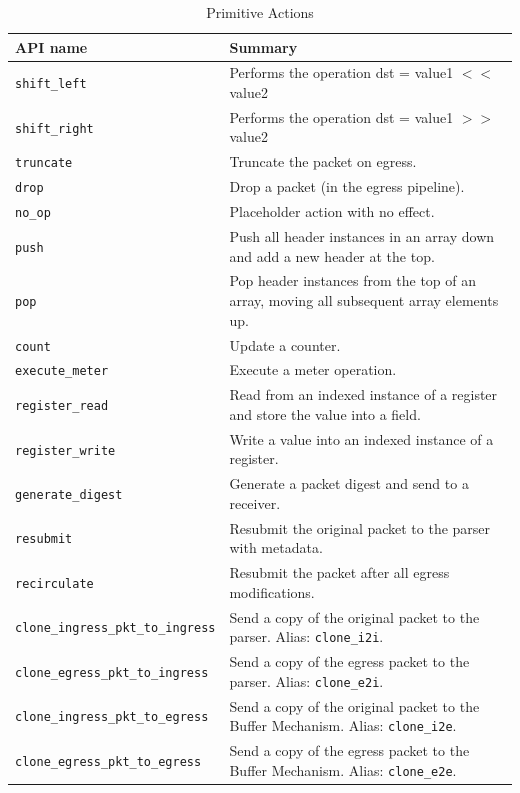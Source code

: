 \documentclass[12pt]{article}
\begin{document}
\begin{table}[H]
\begin{center}
\begin{tabular}{| l | p{} |} \hline
\textbf{API name} &
\textbf{Summary} \\ \hline
\texttt{shift_left} &
Performs the operation dst = value1 $<<$ value2 \\ \hline
\texttt{shift_right} &
Performs the operation dst = value1 $>>$ value2 \\ \hline
\texttt{truncate} &
Truncate the packet on egress. \\ \hline
\texttt{drop} &
Drop a packet (in the egress pipeline). \\ \hline
\texttt{no_op} &
Placeholder action with no effect. \\ \hline
\texttt{push} &
Push all header instances in an array down and add a new header at the top. \\ \hline
\texttt{pop} &
Pop header instances from the top of an array, moving all subsequent array elements up. \\ \hline
\texttt{count} &
Update a counter. \\ \hline
\texttt{execute_meter} &
Execute a meter operation. \\ \hline
\texttt{register_read} &
{Read from an indexed instance of a register and store the value into a field.} \\ \hline
\texttt{register_write} &
{Write a value into an indexed instance of a register. }\\ \hline
\texttt{generate_digest} &
Generate a packet digest and send to a receiver. \\ \hline
\texttt{resubmit} &
Resubmit the original packet to the parser with metadata. \\ \hline
\texttt{recirculate} &
Resubmit the packet after all egress modifications. \\ \hline
\texttt{clone_ingress_pkt_to_ingress} &
Send a copy of the original packet to the parser. Alias: \texttt{clone_i2i}. \\ \hline
\texttt{clone_egress_pkt_to_ingress} &
Send a copy of the egress packet to the parser. Alias: \texttt{clone_e2i}. \\ \hline
\texttt{clone_ingress_pkt_to_egress} &
Send a copy of the original packet to the Buffer Mechanism. Alias: \texttt{clone_i2e}. \\ \hline
\texttt{clone_egress_pkt_to_egress} &
Send a copy of the egress packet to the Buffer Mechanism. Alias: \texttt{clone_e2e}. \\ \hline
\end{tabular}
\end{center}
\caption{Primitive Actions}
\label{tab:primitiveactions}
\end{table}
\end{document}
